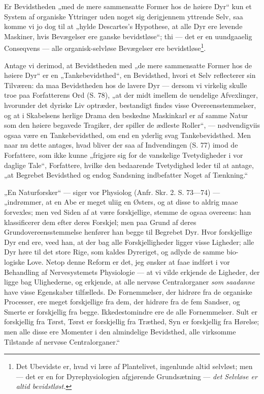 \documentclass[12pt,a4paper]{book}
\begin{document}
Er Bevidstheden „med de mere sammensatte Former hos de høiere Dyr“ kun et
System af organiske Yttringer uden noget sig derigjennem yttrende Selv,
saa komme vi jo dog
\setcounter{footnote}{0}
til at „hylde Descartes's Hypothese, at alle Dyr ere levende Maskiner,
hvis Bevægelser ere ganske bevidstløse“; thi --- det er en uundgaaelig
Conseqvens --- alle organisk-selvløse Bevægelser ere
bevidstløse\footnote{Det Ubevidste er, hvad vi lære af Plantelivet,
ingenlunde altid selvløst; men --- det er en for Dyrephysiologien
afgjørende Grundsætning --- \emph{det Selvløse er altid bevidstløst.}}.

Antage vi derimod, at Bevidstheden med „de mere sammensatte Former hos de
høiere Dyr“ er en „Tankebevidsthed“, en Bevidsthed, hvori et Selv
reflecterer sin Tilværen: da maa Bevidstheden hos de lavere Dyr ---
dersom vi virkelig skulle troe paa Forfatterens Ord (S. 78), „at der midt
imellem de uendelige Afvexlinger, hvorunder det dyriske Liv optræder,
bestandigt findes visse Overeensstemmelser, og at i Skabelsens herlige
Drama den beskedne Maskinkarl er af samme Natur som den høiere begavede
Tragiker, der spiller de ædleste Roller“, --- nødvendigviis ogsaa være en
Tankebevidsthed, om end en yderlig svag Tankebevidsthed. Men naar nu
dette antages, hvad bliver der saa af Indvendingen (S. 77) imod de
Forfattere, som ikke kunne „frigjøre sig for de vanskelige Tvetydigheder
i vor daglige Tale“, Forfattere, hvilke den bedaarende Tvetydighed leder
til at antage, „at Begrebet Bevidsthed og endog Sandsning indbefatter
Noget af Tænkning.“

„En Naturforsker“ --- siger vor Physiolog (Anfr. Skr. 2. S. 73---74) ---
„indrømmer, at en Abe er meget uliig en Østers, og at disse to aldrig
maae forvexles; men ved Siden af at være forskjellige, stemme de ogsaa
overeens: han klassificerer dem efter deres Forskjel; men paa Grund af
deres Grundovereensstemmelse henfører han begge til Begrebet Dyr. Hvor
forskjellige Dyr end ere, veed han, at der bag alle Forskjelligheder
ligger visse Ligheder; alle Dyr høre til det store Rige, som kaldes
Dyreriget, og adlyde de samme bio-
logiske Love. Netop denne Reform er det, jeg ønsker at faae indført i vor
Behandling af Nervesystemets Physiologie --- at vi vilde erkjende de
Ligheder, der ligge bag Ulighederne, og erkjende, at alle nervøse
Centralorganer \emph{som saadanne} have visse Egenskaber tilfælleds. De
Fornemmelser, der hidrøre fra de organiske Processer, ere meget
forskjellige fra dem, der hidrøre fra de fem Sandser, og Smerte er
forskjellig fra begge. Ikkedestomindre ere de alle Fornemmelser. Sult er
forskjellig fra Tørst, Tørst er forskjellig fra Træthed, Syn er
forskjellig fra Hørelse; men alle disse ere Momenter i den almindelige
Bevidsthed, alle virksomme Tilstande af nervøse Centralorganer.“
\end{document}
